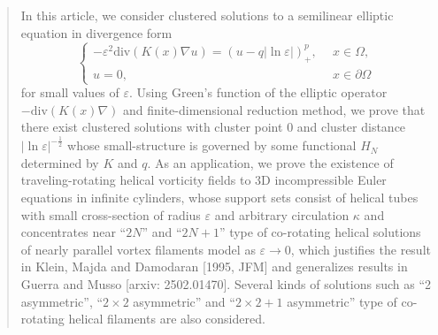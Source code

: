 \documentclass[12pt,reqno]{amsart}
\numberwithin{equation}{section}
\theoremstyle{definition}
\theoremstyle{remark}
\begin{document}
	
\begin{abstract}
In this article, we consider clustered solutions to a semilinear elliptic equation in divergence form
\begin{equation*}
\begin{cases}
-\varepsilon^2\text{div}(K(x)\nabla u)=  (u-q|\ln\varepsilon|)^{p}_+,\ \ &x\in \Omega,\\
u=0,\ \ &x\in\partial \Omega
\end{cases}
\end{equation*}
for small values of $ \varepsilon $. Using Green’s function of the elliptic operator  $ -\text{div}(K(x)\nabla) $ and finite-dimensional reduction method, we prove that there exist  clustered solutions with cluster point $ 0 $ and cluster distance $ |\ln\varepsilon| ^{-\frac{1}{2}} $ whose small-structure is governed by some functional $ H_N $ determined by $ K $ and $ q $. As an application, we prove the existence of traveling-rotating helical vorticity fields to 3D incompressible Euler equations in infinite cylinders, whose support sets consist  of  helical tubes with small cross-section of radius $ \varepsilon $ and arbitrary circulation $ \kappa $ and concentrates near ``$ 2N $'' and ``$ 2N+1 $'' type of co-rotating helical solutions of nearly parallel vortex filaments model as $ \varepsilon\to0 $, which justifies the result in Klein, Majda and Damodaran [1995, JFM] and generalizes results in Guerra and Musso [arxiv: 2502.01470]. Several kinds of solutions such as ``2 asymmetric'', ``$ 2\times2 $ asymmetric'' and ``$ 2\times2+1 $ asymmetric'' type of co-rotating helical filaments are also considered. 


\vspace{0.3cm}


\end{abstract}
\end{document}
